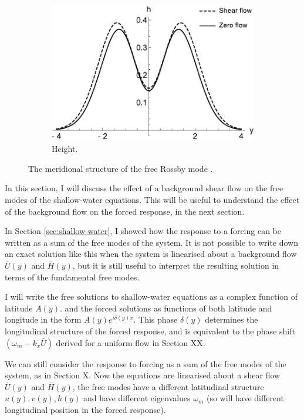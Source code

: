 \begin{figure}
  \begin{subfigure}[b]{0.33\textwidth}
    \includegraphics[width=\textwidth]{figures/wave-mean-flow/free-h-shear.pdf}
    \caption{Height.}
    \label{fig:free-h-shear}
  \end{subfigure}
  \caption{The meridional structure of the free Rossby mode \citep{hammond2018wavemean}.}
  \label{fig:free-shear-meridional}
\end{figure}



In this section, I will discuss the effect of a background shear flow on the free modes of the shallow-water equations. This will be useful to understand the effect of the background flow on the forced response, in the next section.

In Section \ref{sec:shallow-water}, I showed how the response to a forcing can be written as a sum of the free modes of the system. It is not possible to write down an exact solution like this when the system is linearised about a background flow $\overline{U}(y)$ and $\overline{H}(y)$, but it is still useful to interpret the resulting solution in terms of the fundamental free modes.

I will write the free solutions to shallow-water equations as a complex function of latitude $A(y)$. and the forced solutions as functions of both latitude and longitude in the form $A(y) e^{i \delta(y) x}$. This phase $\delta(y)$ determines the longitudinal structure of the forced response, and is equivalent to the phase shift $(\omega_{m} - k_{x} \bar{U})$ derived for a uniform flow in Section XX.

We can still consider the response to forcing as a sum of the free modes of the system, as in Section X. Now the equations are linearised about a shear flow $\overline{U}(y)$ and $\overline{H}(y)$, the free modes have a different latitudinal structure $u(y),v(y),h(y)$ and have different eigenvalues $\omega_{m}$ (so will have different longitudinal position in the forced response).


